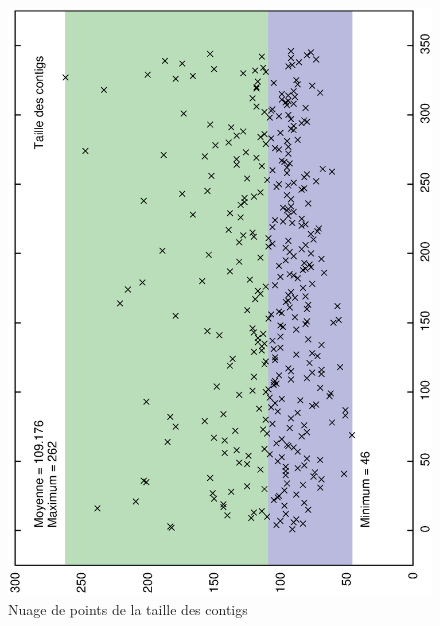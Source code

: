 \documentclass[10.9pt]{article} %
\begin{document}
\begin{figure}[p]
\centering
\includegraphics[scale=0.6,angle=270]{question_1/contigs_taille.eps}
\caption{Nuage de points de la taille des contigs}

\end{figure}
\end{document}
